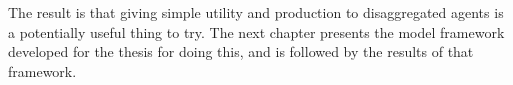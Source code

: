 The result is that giving simple utility and production to disaggregated agents is a potentially useful thing to try. The next chapter presents the model framework developed for the thesis for doing this, and is followed by the results of that framework. 

